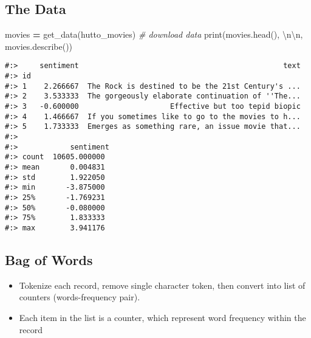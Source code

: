 \documentclass[
]{book}
\newenvironment{Shaded}{\begin{snugshade}}{\end{snugshade}}
\newcommand{\BuiltInTok}[1]{#1}
\newcommand{\CharTok}[1]{\textcolor[rgb]{0.5,0.5,0.5}{#1}}
\newcommand{\CommentTok}[1]{\textcolor[rgb]{0.37,0.37,0.37}{\textit{#1}}}
\newcommand{\NormalTok}[1]{#1}
\newcommand{\OperatorTok}[1]{\textcolor[rgb]{0.43,0.43,0.43}{\textbf{#1}}}
\newcommand{\StringTok}[1]{\textcolor[rgb]{0.5,0.5,0.5}{#1}}
\providecommand{\tightlist}{%
  \setlength{\itemsep}{0pt}\setlength{\parskip}{0pt}}
\begin{document}
\hypertarget{the-data-4}{%
\subsection{The Data}\label{the-data-4}}

\begin{Shaded}
\begin{Highlighting}[]
\NormalTok{movies }\OperatorTok{=}\NormalTok{ get\_data(}\StringTok{\textquotesingle{}hutto\_movies\textquotesingle{}}\NormalTok{)   }\CommentTok{\# download data}
\BuiltInTok{print}\NormalTok{(movies.head(), }\StringTok{\textquotesingle{}}\CharTok{\textbackslash{}n\textbackslash{}n}\StringTok{\textquotesingle{}}\NormalTok{,}
\NormalTok{      movies.describe())}
\end{Highlighting}
\end{Shaded}

\begin{verbatim}
#:>     sentiment                                               text
#:> id                                                              
#:> 1    2.266667  The Rock is destined to be the 21st Century's ...
#:> 2    3.533333  The gorgeously elaborate continuation of ''The...
#:> 3   -0.600000                     Effective but too tepid biopic
#:> 4    1.466667  If you sometimes like to go to the movies to h...
#:> 5    1.733333  Emerges as something rare, an issue movie that... 
#:> 
#:>            sentiment
#:> count  10605.000000
#:> mean       0.004831
#:> std        1.922050
#:> min       -3.875000
#:> 25%       -1.769231
#:> 50%       -0.080000
#:> 75%        1.833333
#:> max        3.941176
\end{verbatim}

\hypertarget{bag-of-words}{%
\subsection{Bag of Words}\label{bag-of-words}}

\begin{itemize}
\tightlist
\item
  Tokenize each record, remove single character token, then convert into list of counters (words-frequency pair).\\
\item
  Each item in the list is a counter, which represent word frequency within the record
\end{itemize}
\end{document}
